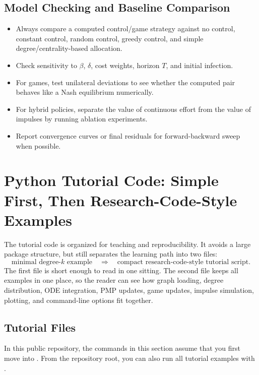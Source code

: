 \documentclass[11pt,a4paper]{article}
\begin{document}
\subsection{Model Checking and Baseline Comparison}

\begin{itemize}
  \item Always compare a computed control/game strategy against no control, constant control, random control, greedy control, and simple degree/centrality-based allocation.
  \item Check sensitivity to $\beta$, $\delta$, cost weights, horizon $T$, and initial infection.
  \item For games, test unilateral deviations to see whether the computed pair behaves like a Nash equilibrium numerically.
  \item For hybrid policies, separate the value of continuous effort from the value of impulses by running ablation experiments.
  \item Report convergence curves or final residuals for forward-backward sweep when possible.
\end{itemize}




\section{Python Tutorial Code: Simple First, Then Research-Code-Style Examples}

The tutorial code is organized for teaching and reproducibility.  It avoids a large package structure, but still separates the learning path into two files:
\[
\text{minimal degree-}k\text{ example} \quad \Longrightarrow \quad \text{compact research-code-style tutorial script}.
\]
The first file is short enough to read in one sitting.  The second file keeps all examples in one place, so the reader can see how graph loading, degree distribution, ODE integration, PMP updates, game updates, impulse simulation, plotting, and command-line options fit together.

\subsection{Tutorial Files}

In this public repository, the commands in this section assume that you first move into . From the repository root, you can also run all tutorial examples with .
\end{document}
